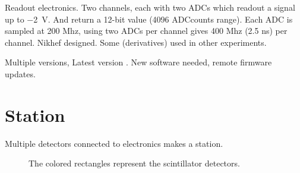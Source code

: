 Readout electronics. Two channels, each with two ADCs which readout a
signal up to \SI{-2}{\volt}. And return a 12-bit value (4096 ADCcounts
range). Each ADC is sampled at 200 Mhz, using two ADCs per channel gives
400 Mhz (2.5 ns) per channel. Nikhef designed. Some (derivatives) used
in other experiments.

Multiple versions, Latest version \hisparciii. New software needed,
remote firmware updates.


\section{Station}

Multiple detectors connected to \hisparc electronics makes a station.

\begin{figure}
    \centering
    
    \caption{ The colored
             rectangles represent the scintillator detectors.}
    \label{fig:4_detector_station}
\end{figure}
